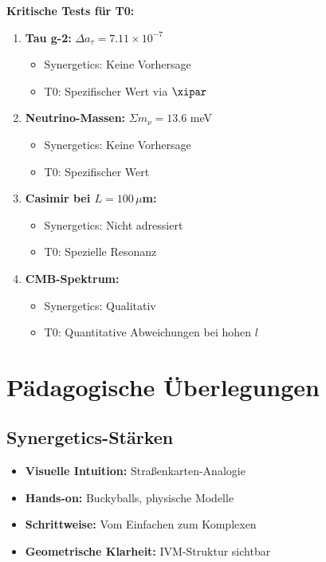 	\begin{vorteil}
		\textbf{Kritische Tests für T0:}
		
		\begin{enumerate}
			\item \textbf{Tau g-2:} $\Delta a_\tau = 7.11 \times 10^{-7}$
			\begin{itemize}
				\item Synergetics: Keine Vorhersage
				\item T0: Spezifischer Wert via $\xipar$
			\end{itemize}
			
			\item \textbf{Neutrino-Massen:} $\Sigma m_\nu = 13.6$ meV
			\begin{itemize}
				\item Synergetics: Keine Vorhersage
				\item T0: Spezifischer Wert
			\end{itemize}
			
			\item \textbf{Casimir bei $L = 100\,\mu$m:}
			\begin{itemize}
				\item Synergetics: Nicht adressiert
				\item T0: Spezielle Resonanz
			\end{itemize}
			
			\item \textbf{CMB-Spektrum:}
			\begin{itemize}
				\item Synergetics: Qualitativ
				\item T0: Quantitative Abweichungen bei hohen $l$
			\end{itemize}
		\end{enumerate}
	\end{vorteil}
	
	\section{Pädagogische Überlegungen}
	
	\subsection{Synergetics-Stärken}
	
	\begin{itemize}
		\item \textbf{Visuelle Intuition:} Straßenkarten-Analogie
		\item \textbf{Hands-on:} Buckyballs, physische Modelle
		\item \textbf{Schrittweise:} Vom Einfachen zum Komplexen
		\item \textbf{Geometrische Klarheit:} IVM-Struktur sichtbar
	\end{itemize}
	
